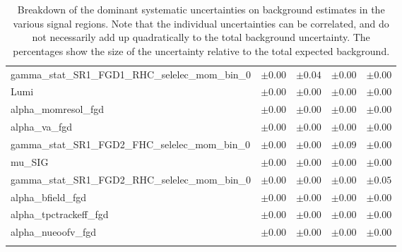 \begin{table}
\begin{center}
\begin{tabular*}{\textwidth}{@{\extracolsep{\fill}}lcccc}
gamma\_stat\_SR1\_FGD1\_RHC\_selelec\_mom\_bin\_0         & $\pm 0.00$          & $\pm 0.04$          & $\pm 0.00$          & $\pm 0.00$       \\
Lumi         & $\pm 0.00$          & $\pm 0.00$          & $\pm 0.00$          & $\pm 0.00$       \\
alpha\_momresol\_fgd         & $\pm 0.00$          & $\pm 0.00$          & $\pm 0.00$          & $\pm 0.00$       \\
alpha\_va\_fgd         & $\pm 0.00$          & $\pm 0.00$          & $\pm 0.00$          & $\pm 0.00$       \\
gamma\_stat\_SR1\_FGD2\_FHC\_selelec\_mom\_bin\_0         & $\pm 0.00$          & $\pm 0.00$          & $\pm 0.09$          & $\pm 0.00$       \\
mu\_SIG         & $\pm 0.00$          & $\pm 0.00$          & $\pm 0.00$          & $\pm 0.00$       \\
gamma\_stat\_SR1\_FGD2\_RHC\_selelec\_mom\_bin\_0         & $\pm 0.00$          & $\pm 0.00$          & $\pm 0.00$          & $\pm 0.05$       \\
alpha\_bfield\_fgd         & $\pm 0.00$          & $\pm 0.00$          & $\pm 0.00$          & $\pm 0.00$       \\
alpha\_tpctrackeff\_fgd         & $\pm 0.00$          & $\pm 0.00$          & $\pm 0.00$          & $\pm 0.00$       \\
alpha\_nueoofv\_fgd         & $\pm 0.00$          & $\pm 0.00$          & $\pm 0.00$          & $\pm 0.00$       \\
\noalign{\smallskip}\hline\noalign{\smallskip}
\end{tabular*}
\end{center}
\caption[Breakdown of uncertainty on background estimates]{
Breakdown of the dominant systematic uncertainties on background estimates in the various signal regions.
Note that the individual uncertainties can be correlated, and do not necessarily add up quadratically to 
the total background uncertainty. The percentages show the size of the uncertainty relative to the total expected background.
\label{table.results.bkgestimate.uncertainties.SR1_FGD1_FHC_SR1_FGD1_RHC_SR1_FGD2_FHC_SR1_FGD2_RHC}}
\end{table}
%
